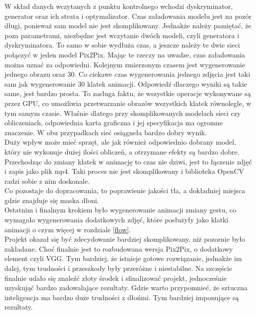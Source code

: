 \documentclass[12pt]{article}
\begin{document}
\begin{sloppypar}
{{    W skład danych wczytanych z punktu kontrolnego wchodzi dyskryminator, generator oraz ich strata i optymalizator. 
    Czas załadowania modelu jest na pozór długi, ponieważ sam model nie jest skomplikowany. 
    Jednakże należy pamiętać, że poza parametrami, niezbędne jest wczytanie dwóch modeli, czyli generatora i dyskryminatora. 
    To samo w sobie wydłuża czas, a jeszcze należy te dwie sieci połączyć w jeden model Pix2Pix. Mając te rzeczy na uwadze, czas załadowania można uznać za odpowiedni. 
    Kolejnym zmierzonym czasem jest wygenerowanie jednego obrazu oraz 30. Co ciekawe czas wygenerowania jednego zdjęcia jest taki sam jak wygenerowanie 30 klatek animacji. 
    Odpowiedź dlaczego wyniki są takie same, jest bardzo prosta. To zasługa faktu, że wszystkie operacje wykonywane są przez GPU, co umożliwia przetwarzanie obrazów wszystkich klatek równolegle, w tym samym czasie. 
    Właśnie dlatego przy skomplikowanych modelach sieci czy obliczeniach, odpowiednia karta graficzna i jej specyfikacja ma ogromne znaczenie.  
    W obu przypadkach sieć osiągneła bardzo dobry wynik. \\
    Duży wpływ może mieć sprzęt, ale jak również odpowiednio dobrany model, który nie wykonuje dużej ilości obliczeń, a otrzymane efekty są bardzo dobre. 
    Przechodząc do zmiany klatek w animację to czas nie dziwi, jest to łączenie zdjęć i zapis jako plik mp4. 
    Taki proces nie jest skomplikowany i biblioteka OpenCV radzi sobie z nim doskonale. \\
    Co pozostaje do dopracowania, to poprawienie jakości tła, a dokładniej miejsca gdzie znajduje się maska dłoni. \\
    Ostatnim i finalnym krokiem było wygenerowanie animacji zmiany gestu, co wymagało wygenerowania dodatkowych zdjęć, które posłużyły jako klatki animacji o czym więcej w rozdziale \ref{flow}. \\
    Projekt okazał się być zdecydowanie bardziej skomplikowany, niż pozornie było zakładane. 
    Choć finalnie jest to rozbudowana wersja Pix2Pix, o dodatkowy element czyli VGG. 
    Tym bardziej, że istnieje gotowe rozwiązanie, jednakże im dalej, tym trudności i przeszkody były przeróżne i niestabilne. 
    Na szczęście finalnie udało się znaleźć złoty środek i sfinalizować projekt, jednocześnie uzyskująć bardzo zadowalające rezultaty. 
    Gdzie warto przypomnieć, że sztuczna inteligencja ma bardzo duże trudności z dłońmi. Tym bardziej imponujące są rezultaty.
  }
}


\end{sloppypar}
\end{document}
